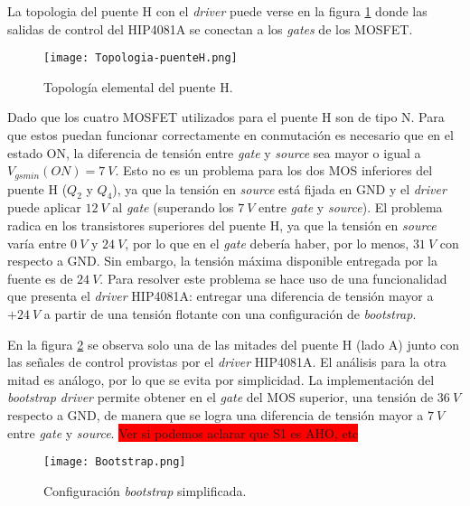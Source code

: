 La topologia del puente H con el \textsl{driver} puede verse en la figura \ref{fig:img_topologia-puenteH} donde las salidas de control del HIP4081A se conectan a los \textsl{gates} de los MOSFET.

\begin{figure}[H]
	\centering
	\texttt{[image: Topologia-puenteH.png]}
	\caption{Topología elemental del puente H.}
	\label{fig:img_topologia-puenteH}
\end{figure}

Dado que los cuatro MOSFET utilizados para el puente H son de tipo N. Para que estos puedan funcionar correctamente en conmutación es necesario que en el estado ON, la diferencia de tensión entre \textsl{gate} y \textsl{source} sea mayor o igual a $V_{gs min}(ON) = 7\:V$. Esto no es un problema para los dos MOS inferiores del puente H ($Q_2$ y $Q_4$), ya que la tensión en \textsl{source} está fijada en GND y el \textsl{driver} puede aplicar $12\:V$ al \textsl{gate} (superando los $7\:V$ entre \textsl{gate} y \textsl{source}). El problema radica en los transistores superiores del puente H, ya que la tensión en \textsl{source} varía entre $0\:V$ y $24\:V$, por lo que en el \textsl{gate} debería haber, por lo menos, $31\:V$ con respecto a GND. Sin embargo, la tensión máxima disponible entregada por la fuente es de $24\:V$. Para resolver este problema se hace uso de una funcionalidad que presenta el \textsl{driver} HIP4081A: entregar una diferencia de tensión mayor a $+24\:V$ a partir de una tensión flotante con una configuración de \textsl{bootstrap}.

En la figura \ref{fig:img_bootstrap} se observa solo una de las mitades del puente H (lado A) junto con las señales de control provistas por el \textsl{driver} HIP4081A.  El análisis para la otra mitad es análogo, por lo que se evita por simplicidad. La implementación del \textsl{bootstrap driver} permite obtener en el \textsl{gate} del MOS superior, una tensión de $36\:V$ respecto a GND, de manera que se logra una diferencia de tensión mayor a $7\:V$ entre \textsl{gate} y \textsl{source}. 
\colorbox{red}{Ver si podemos aclarar que S1 es AHO, etc}
\begin{figure}[H]
	\centering
	\texttt{[image: Bootstrap.png]}
	\caption{Configuración \textsl{bootstrap} simplificada.}
	\label{fig:img_bootstrap}
\end{figure}

